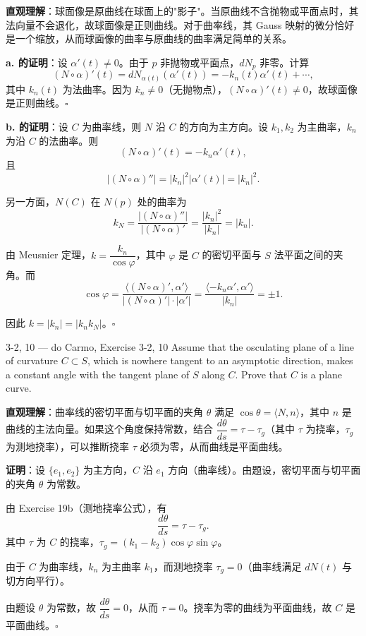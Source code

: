 \begin{solution}
\textbf{直观理解}：球面像是原曲线在球面上的"影子"。当原曲线不含抛物或平面点时，其法向量不会退化，故球面像是正则曲线。对于曲率线，其 Gauss 映射的微分恰好是一个缩放，从而球面像的曲率与原曲线的曲率满足简单的关系。

\textbf{a. 的证明}：设 $\alpha'(t) \neq 0$。由于 $p$ 非抛物或平面点，$dN_p$ 非零。计算
\[
(N \circ \alpha)'(t) = dN_{\alpha(t)}(\alpha'(t)) = -k_n(t) \alpha'(t) + \cdots,
\]
其中 $k_n(t)$ 为法曲率。因为 $k_n \neq 0$（无抛物点），$(N \circ \alpha)'(t) \neq 0$，故球面像是正则曲线。$\square$

\textbf{b. 的证明}：设 $C$ 为曲率线，则 $N$ 沿 $C$ 的方向为主方向。设 $k_1, k_2$ 为主曲率，$k_n$ 为沿 $C$ 的法曲率。则
\[
(N \circ \alpha)'(t) = -k_n \alpha'(t),
\]
且
\[
|(N \circ \alpha)''| = |k_n|^2 |\alpha'(t)| = |k_n|^2.
\]

另一方面，$N(C)$ 在 $N(p)$ 处的曲率为
\[
k_N = \frac{|(N \circ \alpha)''|}{|(N \circ \alpha)'} = \frac{|k_n|^2}{|k_n|} = |k_n|.
\]

由 Meusnier 定理，$k = \dfrac{k_n}{\cos\varphi}$，其中 $\varphi$ 是 $C$ 的密切平面与 $S$ 法平面之间的夹角。而
\[
\cos\varphi = \frac{\langle (N \circ \alpha)', \alpha' \rangle}{|(N \circ \alpha)'| \cdot |\alpha'|} = \frac{\langle -k_n \alpha', \alpha' \rangle}{|k_n|} = \pm 1.
\]

因此 $k = |k_n| = |k_n k_N|$。$\square$
\end{solution}

\begin{exercise}{3-2, 10 — do Carmo, Exercise 3-2, 10}
Assume that the osculating plane of a line of curvature $C \subset S$, which is nowhere tangent to an asymptotic direction, makes a constant angle with the tangent plane of $S$ along $C$. Prove that $C$ is a plane curve.
\end{exercise}

\begin{solution}
\textbf{直观理解}：曲率线的密切平面与切平面的夹角 $\theta$ 满足 $\cos\theta = \langle N, n \rangle$，其中 $n$ 是曲线的主法向量。如果这个角度保持常数，结合 $\dfrac{d\theta}{ds} = \tau - \tau_g$（其中 $\tau$ 为挠率，$\tau_g$ 为测地挠率），可以推断挠率 $\tau$ 必须为零，从而曲线是平面曲线。

\textbf{证明}：设 $\{e_1, e_2\}$ 为主方向，$C$ 沿 $e_1$ 方向（曲率线）。由题设，密切平面与切平面的夹角 $\theta$ 为常数。

由 Exercise 19b（测地挠率公式），有
\[
\frac{d\theta}{ds} = \tau - \tau_g.
\]
其中 $\tau$ 为 $C$ 的挠率，$\tau_g = (k_1 - k_2)\cos\varphi\sin\varphi$。

由于 $C$ 为曲率线，$k_n$ 为主曲率 $k_1$，而测地挠率 $\tau_g = 0$（曲率线满足 $dN(t)$ 与切方向平行）。

由题设 $\theta$ 为常数，故 $\dfrac{d\theta}{ds} = 0$，从而 $\tau = 0$。挠率为零的曲线为平面曲线，故 $C$ 是平面曲线。$\square$
\end{solution}

